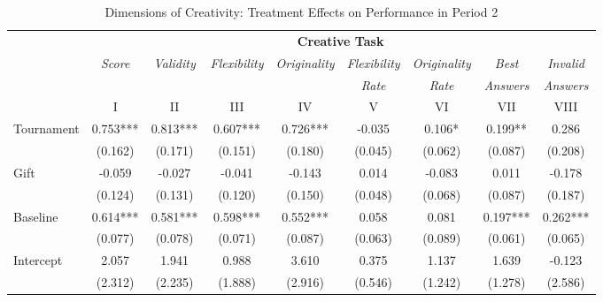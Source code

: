 \begin{landscape}
\begin{table}[h]%
\setlength\tabcolsep{2pt}
\caption{Dimensions of Creativity: Treatment Effects on Performance in Period 2}
\label{tab:CreativityBreakdown}
\begin{center}%
{\small\renewcommand{\arraystretch}{1}%
\begin{tabular}{lcccccccc}
\hline\hline\noalign{\smallskip}
 & \multicolumn{8}{c}{\textbf{Creative Task}} \\
 & \textit{Score} & \textit{Validity} & \textit{Flexibility} & \textit{Originality} & \textit{Flexibility} & \textit{Originality} & \textit{Best} & \textit{Invalid} \\
 &                                     &                                       &                                               &                                       &       \textit{Rate}           &       \textit{Rate}           &       \textit{Answers}                &       \textit{Answers} \\
 & I & II & III & IV & V & VI & VII & VIII \\
\hline
Tournament          &       0.753***&       0.813***&       0.607***&       0.726***&      -0.035   &       0.106*  &       0.199** &       0.286   \\
                    &     (0.162)   &     (0.171)   &     (0.151)   &     (0.180)   &     (0.045)   &     (0.062)   &     (0.087)   &     (0.208)   \\
Gift                &      -0.059   &      -0.027   &      -0.041   &      -0.143   &       0.014   &      -0.083   &       0.011   &      -0.178   \\
                    &     (0.124)   &     (0.131)   &     (0.120)   &     (0.150)   &     (0.048)   &     (0.068)   &     (0.087)   &     (0.187)   \\
Baseline            &       0.614***&       0.581***&       0.598***&       0.552***&       0.058   &       0.081   &       0.197***&       0.262***\\
                    &     (0.077)   &     (0.078)   &     (0.071)   &     (0.087)   &     (0.063)   &     (0.089)   &     (0.061)   &     (0.065)   \\
Intercept           &       2.057   &       1.941   &       0.988   &       3.610   &       0.375   &       1.137   &       1.639   &      -0.123   \\
                    &     (2.312)   &     (2.235)   &     (1.888)   &     (2.916)   &     (0.546)   &     (1.242)   &     (1.278)   &     (2.586)   \\

\end{tabular}}
\end{center}
\end{table}
\end{landscape}
